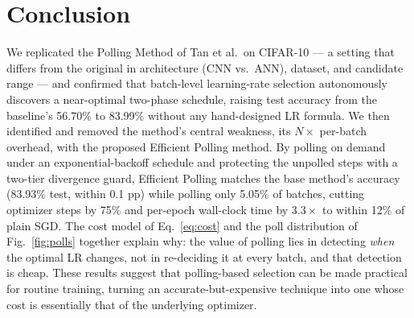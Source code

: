\documentclass[conference]{IEEEtran}
\begin{document}
\section{Conclusion}

We replicated the Polling Method of Tan et al.\ on CIFAR-10 --- a setting that differs from the original in architecture (CNN vs.\ ANN), dataset, and candidate range --- and confirmed that batch-level learning-rate selection autonomously discovers a near-optimal two-phase schedule, raising test accuracy from the baseline's 56.70\% to 83.99\% without any hand-designed LR formula. We then identified and removed the method's central weakness, its $N\times$ per-batch overhead, with the proposed Efficient Polling method. By polling on demand under an exponential-backoff schedule and protecting the unpolled steps with a two-tier divergence guard, Efficient Polling matches the base method's accuracy (83.93\% test, within 0.1 pp) while polling only 5.05\% of batches, cutting optimizer steps by 75\% and per-epoch wall-clock time by $3.3\times$ to within 12\% of plain SGD. The cost model of Eq.~\eqref{eq:cost} and the poll distribution of Fig.~\ref{fig:polls} together explain why: the value of polling lies in detecting \emph{when} the optimal LR changes, not in re-deciding it at every batch, and that detection is cheap. These results suggest that polling-based selection can be made practical for routine training, turning an accurate-but-expensive technique into one whose cost is essentially that of the underlying optimizer.
\end{document}
